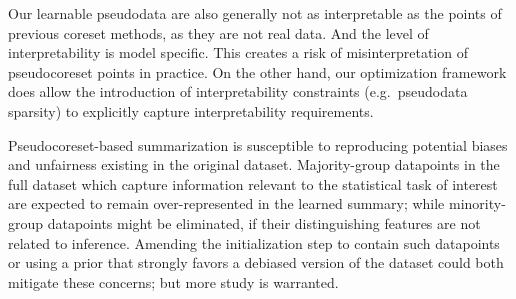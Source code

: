 Our learnable pseudodata are also generally not as interpretable 
as the points of previous coreset methods, as they are not real data. And the level of 
interpretability is model specific. This creates a risk of misinterpretation
of pseudocoreset points in practice. On the other hand, our optimization framework
does allow the introduction of interpretability constraints (e.g.~pseudodata sparsity)
to explicitly capture interpretability requirements.

Pseudocoreset-based summarization is susceptible to reproducing potential
biases and unfairness existing in the original dataset. Majority-group datapoints in the full dataset which capture information relevant to the
statistical task of interest are expected to remain over-represented in the
learned summary; while minority-group datapoints might be eliminated, if their
distinguishing features are not related to inference. Amending the
initialization step to contain such datapoints or using a prior that
strongly favors a debiased version of the dataset could both mitigate these
concerns; but more study is warranted.

